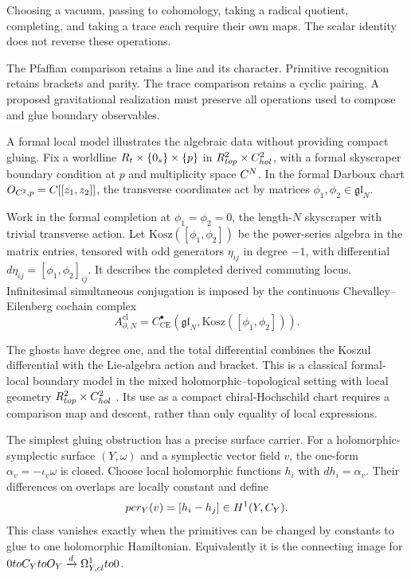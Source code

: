 \begin{remark}
\label{rem:beilinson-cut-delta5}
Choosing a vacuum, passing to cohomology, taking a radical quotient,
completing, and taking a trace each require their own maps. The
scalar identity does not reverse these operations.

The Pfaffian comparison retains a line and its character.
Primitive recognition retains brackets and parity.
The trace comparison retains a cyclic
pairing. A proposed gravitational realization must preserve all
operations used to compose and glue boundary observables.
\end{remark}

A formal local model illustrates the algebraic data without providing
compact gluing. Fix a worldline \(R_t\times\{0_s\}\times\{p\}\) in
\(R^2_{top}\times C^2_{hol}\), with a
formal skyscraper boundary condition at \(p\) and multiplicity
space \(C^N\). In the formal Darboux chart
\(O_{C^2,p}=C[[z_1,z_2]]\), the transverse
coordinates act by matrices
\(\phi_1,\phi_2\in\mathfrak{gl}_N\).

Work in the formal completion at \(\phi_1=\phi_2=0\), the
length-\(N\) skyscraper with trivial transverse action. Let
\(\mathrm{Kosz}([\phi_1,\phi_2])\) be the power-series algebra
in the matrix entries, tensored with odd generators \(\eta_{ij}\) in
degree \(-1\), with differential
\(d\eta_{ij}=[\phi_1,\phi_2]_{ij}\). It describes the completed derived
commuting locus. Infinitesimal simultaneous conjugation is imposed
by the continuous Chevalley--Eilenberg cochain complex
\[
 A^{\mathrm{cl}}_{\partial,N}
 =C^\bullet_{\mathrm{CE}}(\mathfrak{gl}_N,
        \mathrm{Kosz}([\phi_1,\phi_2])).
\]

The ghosts have degree one, and the total differential combines the
Koszul differential with the Lie-algebra action and bracket.
This is a classical formal-local boundary model in the mixed
holomorphic--topological setting with local geometry
\(R^2_{top}\times C^2_{hol}\)
\cite{CostelloLiBCOV,CostelloLiOpenClosedBCOV}.
Its use as a compact chiral-Hochschild chart requires a comparison
map and descent, rather than only equality of local expressions.

The simplest gluing obstruction has a precise surface carrier.
For a holomorphic-symplectic surface \((Y,\omega)\) and a symplectic
vector field \(v\), the one-form \(\alpha_v=-\iota_v\omega\) is
closed. Choose local holomorphic functions \(h_i\) with
\(dh_i=\alpha_v\). Their differences on overlaps are locally
constant and define
\[
 per_Y(v)=[h_i-h_j]\in H^1(Y,C_Y).
\]
This class vanishes exactly when the primitives can be changed by
constants to glue to one holomorphic Hamiltonian. Equivalently it
is the connecting image for
\(0toC_YtoO_Y\xrightarrow{d}
\Omega^1_{Y,cl}to0\).

